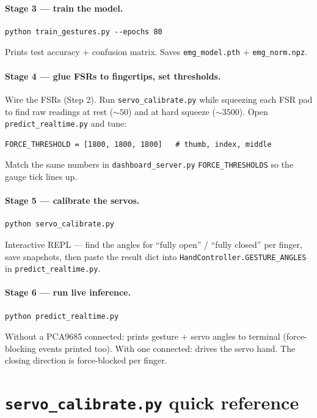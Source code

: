 \documentclass[10pt, a4paper]{article}
\begin{document}
\paragraph{Stage 3 --- train the model.}
\begin{lstlisting}
python train_gestures.py --epochs 80
\end{lstlisting}
Prints test accuracy + confusion matrix. Saves \texttt{emg\_model.pth} + \texttt{emg\_norm.npz}.

\paragraph{Stage 4 --- glue FSRs to fingertips, set thresholds.}
Wire the FSRs (Step 2). Run \texttt{servo\_calibrate.py} while squeezing each FSR pad to find raw readings at rest ($\sim 50$) and at hard squeeze ($\sim 3500$). Open \texttt{predict\_realtime.py} and tune:
\begin{lstlisting}
FORCE_THRESHOLD = [1800, 1800, 1800]   # thumb, index, middle
\end{lstlisting}
Match the same numbers in \texttt{dashboard\_server.py} \texttt{FORCE\_THRESHOLDS} so the gauge tick lines up.

\paragraph{Stage 5 --- calibrate the servos.}
\begin{lstlisting}
python servo_calibrate.py
\end{lstlisting}
Interactive REPL --- find the angles for ``fully open'' / ``fully closed'' per finger, save snapshots, then paste the result dict into \texttt{HandController.GESTURE\_ANGLES} in \texttt{predict\_realtime.py}.

\paragraph{Stage 6 --- run live inference.}
\begin{lstlisting}
python predict_realtime.py
\end{lstlisting}
Without a PCA9685 connected: prints gesture + servo angles to terminal (force-blocking events printed too). With one connected: drives the servo hand. The closing direction is force-blocked per finger.

\section*{\texttt{servo\_calibrate.py} quick reference}
\end{document}
